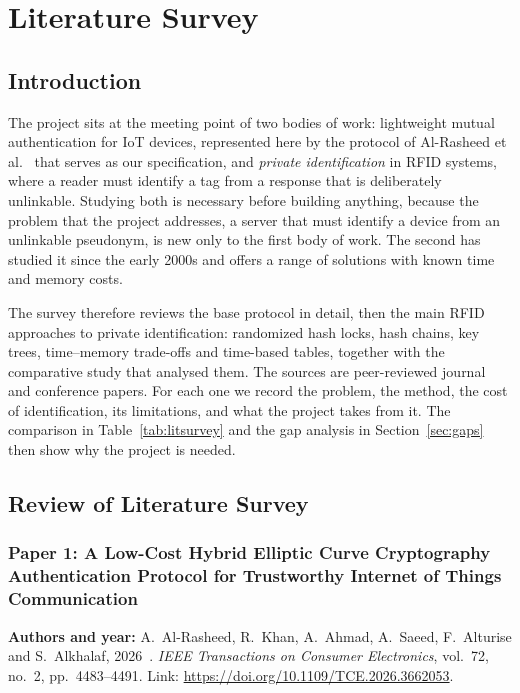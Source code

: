 \chapter{Literature Survey}

\section{Introduction}
The project sits at the meeting point of two bodies of work: lightweight mutual authentication for IoT devices, represented here by the protocol of Al-Rasheed et al.~\cite{base} that serves as our specification, and \emph{private identification} in RFID systems, where a reader must identify a tag from a response that is deliberately unlinkable. Studying both is necessary before building anything, because the problem that the project addresses, a server that must identify a device from an unlinkable pseudonym, is new only to the first body of work. The second has studied it since the early 2000s and offers a range of solutions with known time and memory costs.

The survey therefore reviews the base protocol in detail, then the main RFID approaches to private identification: randomized hash locks, hash chains, key trees, time--memory trade-offs and time-based tables, together with the comparative study that analysed them. The sources are peer-reviewed journal and conference papers. For each one we record the problem, the method, the cost of identification, its limitations, and what the project takes from it. The comparison in Table~\ref{tab:litsurvey} and the gap analysis in Section~\ref{sec:gaps} then show why the project is needed.

\section{Review of Literature Survey}

\subsection*{Paper 1: A Low-Cost Hybrid Elliptic Curve Cryptography Authentication Protocol for Trustworthy Internet of Things Communication}
\textbf{Authors and year:} A.~Al-Rasheed, R.~Khan, A.~Ahmad, A.~Saeed, F.~Alturise and S.~Alkhalaf, 2026~\cite{base}. \emph{IEEE Transactions on Consumer Electronics}, vol.~72, no.~2, pp.~4483--4491. Link: \url{https://doi.org/10.1109/TCE.2026.3662053}.

